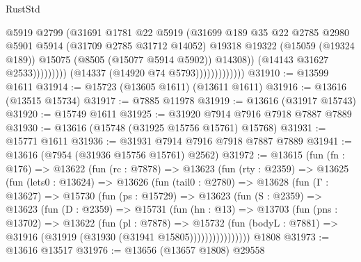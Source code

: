 \begin{lexlean}{RustStd}
\begin{coremodule}
                                          @5919
                                          @2799
                                          (@31691
                                            @1781
                                            @22
                                            @5919
                                            (@31699
                                              @189
                                              @35
                                              @22
                                              @2785
                                              @2980
                                              @5901
                                              @5914
                                              (@31709 @2785 @31712 @14052)
                                              @19318
                                              @19322
                                              (@15059 (@19324 @189))
                                              @15075
                                              (@8505 (@15077 @5914 @5902))
                                              @14308))
                                          (@14143 @31627 @2533)))))))))
                          (@14337 (@14920 @74 @5793)))))))))))))
@31910 := @13599 @1611
@31914 := @15723 (@13605 @1611) (@13611 @1611)
@31916 := @13616 (@13515 @15734)
@31917 := @7885 @11978
@31919 := @13616 (@31917 @15743)
@31920 := @15749 @1611
@31925 := @31920 @7914 @7916 @7918 @7887 @7889
@31930 := @13616 (@15748 (@31925 @15756 @15761) @15768)
@31931 := @15771 @1611
@31936 := @31931 @7914 @7916 @7918 @7887 @7889
@31941 := @13616 (@7954 (@31936 @15756 @15761) @2562)
@31972 := @13615
    (fun (fn : @176) =>
    @13622
      (fun (rc : @7878) =>
      @13623
        (fun (rty : @2359) =>
        @13625
          (fun (lets0 : @13624) =>
          @13626
            (fun (tail0 : @2780) =>
            @13628
              (fun (Γ : @13627) =>
              @15730
                (fun (ps : @15729) =>
                @13623
                  (fun (S : @2359) =>
                  @13623
                    (fun (D : @2359) =>
                    @15731
                      (fun (hn : @13) =>
                      @13703
                        (fun (pns : @13702) =>
                        @13622
                          (fun (pl : @7878) =>
                          @15732
                            (fun (bodyL : @7881) =>
                            @31916 (@31919 (@31930 (@31941 @15805))))))))))))))))
    @1808
@31973 := @13616 @13517
@31976 := @13656 (@13657 @1808) @29558

\end{coremodule}
\end{lexlean}
